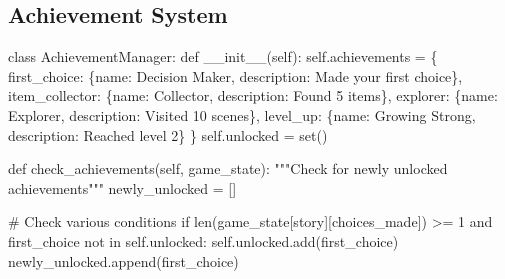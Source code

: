 \documentclass[
  letterpaper,
  DIV=11,
  numbers=noendperiod,
  oneside]{scrreprt}
\newenvironment{Shaded}{}{}
\newcommand{\BuiltInTok}[1]{\textcolor[rgb]{0.84,0.23,0.29}{#1}}
\newcommand{\CommentTok}[1]{\textcolor[rgb]{0.42,0.45,0.49}{#1}}
\newcommand{\ControlFlowTok}[1]{\textcolor[rgb]{0.84,0.23,0.29}{#1}}
\newcommand{\DecValTok}[1]{\textcolor[rgb]{0.00,0.36,0.77}{#1}}
\newcommand{\FunctionTok}[1]{\textcolor[rgb]{0.44,0.26,0.76}{#1}}
\newcommand{\KeywordTok}[1]{\textcolor[rgb]{0.84,0.23,0.29}{#1}}
\newcommand{\NormalTok}[1]{\textcolor[rgb]{0.14,0.16,0.18}{#1}}
\newcommand{\OperatorTok}[1]{\textcolor[rgb]{0.14,0.16,0.18}{#1}}
\newcommand{\StringTok}[1]{\textcolor[rgb]{0.01,0.18,0.38}{#1}}
\newcommand{\VariableTok}[1]{\textcolor[rgb]{0.89,0.38,0.04}{#1}}
\begin{document}
\subsection{Achievement System}\label{achievement-system}

\begin{Shaded}
\begin{Highlighting}[]
\KeywordTok{class}\NormalTok{ AchievementManager:}
    \KeywordTok{def} \FunctionTok{\_\_init\_\_}\NormalTok{(}\VariableTok{self}\NormalTok{):}
        \VariableTok{self}\NormalTok{.achievements }\OperatorTok{=}\NormalTok{ \{}
            \StringTok{\textquotesingle{}first\_choice\textquotesingle{}}\NormalTok{: \{}\StringTok{\textquotesingle{}name\textquotesingle{}}\NormalTok{: }\StringTok{\textquotesingle{}Decision Maker\textquotesingle{}}\NormalTok{, }\StringTok{\textquotesingle{}description\textquotesingle{}}\NormalTok{: }\StringTok{\textquotesingle{}Made your first choice\textquotesingle{}}\NormalTok{\},}
            \StringTok{\textquotesingle{}item\_collector\textquotesingle{}}\NormalTok{: \{}\StringTok{\textquotesingle{}name\textquotesingle{}}\NormalTok{: }\StringTok{\textquotesingle{}Collector\textquotesingle{}}\NormalTok{, }\StringTok{\textquotesingle{}description\textquotesingle{}}\NormalTok{: }\StringTok{\textquotesingle{}Found 5 items\textquotesingle{}}\NormalTok{\},}
            \StringTok{\textquotesingle{}explorer\textquotesingle{}}\NormalTok{: \{}\StringTok{\textquotesingle{}name\textquotesingle{}}\NormalTok{: }\StringTok{\textquotesingle{}Explorer\textquotesingle{}}\NormalTok{, }\StringTok{\textquotesingle{}description\textquotesingle{}}\NormalTok{: }\StringTok{\textquotesingle{}Visited 10 scenes\textquotesingle{}}\NormalTok{\},}
            \StringTok{\textquotesingle{}level\_up\textquotesingle{}}\NormalTok{: \{}\StringTok{\textquotesingle{}name\textquotesingle{}}\NormalTok{: }\StringTok{\textquotesingle{}Growing Strong\textquotesingle{}}\NormalTok{, }\StringTok{\textquotesingle{}description\textquotesingle{}}\NormalTok{: }\StringTok{\textquotesingle{}Reached level 2\textquotesingle{}}\NormalTok{\}}
\NormalTok{        \}}
        \VariableTok{self}\NormalTok{.unlocked }\OperatorTok{=} \BuiltInTok{set}\NormalTok{()}
    
    \KeywordTok{def}\NormalTok{ check\_achievements(}\VariableTok{self}\NormalTok{, game\_state):}
        \CommentTok{"""Check for newly unlocked achievements"""}
\NormalTok{        newly\_unlocked }\OperatorTok{=}\NormalTok{ []}
        
        \CommentTok{\# Check various conditions}
        \ControlFlowTok{if} \BuiltInTok{len}\NormalTok{(game\_state[}\StringTok{\textquotesingle{}story\textquotesingle{}}\NormalTok{][}\StringTok{\textquotesingle{}choices\_made\textquotesingle{}}\NormalTok{]) }\OperatorTok{\textgreater{}=} \DecValTok{1} \KeywordTok{and} \StringTok{\textquotesingle{}first\_choice\textquotesingle{}} \KeywordTok{not} \KeywordTok{in} \VariableTok{self}\NormalTok{.unlocked:}
            \VariableTok{self}\NormalTok{.unlocked.add(}\StringTok{\textquotesingle{}first\_choice\textquotesingle{}}\NormalTok{)}
\NormalTok{            newly\_unlocked.append(}\StringTok{\textquotesingle{}first\_choice\textquotesingle{}}\NormalTok{)}
        

\end{Highlighting}
\end{Shaded}
\end{document}
